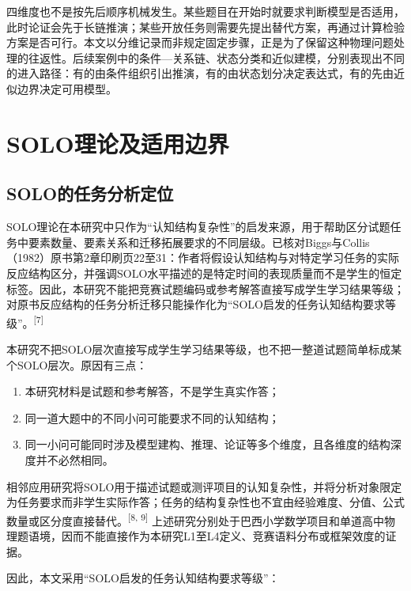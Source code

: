 \documentclass[
  12pt,
  a4paper,twoside,openany]{ctexbook}
\providecommand{\tightlist}{%
  \setlength{\itemsep}{0pt}\setlength{\parskip}{0pt}}
\begin{document}
四维度也不是按先后顺序机械发生。某些题目在开始时就要求判断模型是否适用，此时论证会先于长链推演；某些开放任务则需要先提出替代方案，再通过计算检验方案是否可行。本文以分维记录而非规定固定步骤，正是为了保留这种物理问题处理的往返性。后续案例中的条件---关系链、状态分类和近似建模，分别表现出不同的进入路径：有的由条件组织引出推演，有的由状态划分决定表达式，有的先由近似边界决定可用模型。

\section{SOLO理论及适用边界}\label{soloux7406ux8bbaux53caux9002ux7528ux8fb9ux754c}

\subsection{SOLO的任务分析定位}\label{soloux7684ux4efbux52a1ux5206ux6790ux5b9aux4f4d}

SOLO理论在本研究中只作为``认知结构复杂性''的启发来源，用于帮助区分试题任务中要素数量、要素关系和迁移拓展要求的不同层级。已核对Biggs与Collis（1982）原书第2章印刷页22至31：作者将假设认知结构与对特定学习任务的实际反应结构区分，并强调SOLO水平描述的是特定时间的表现质量而不是学生的恒定标签。因此，本研究不能把竞赛试题编码或参考解答直接写成学生学习结果等级；对原书反应结构的任务分析迁移只能操作化为``SOLO启发的任务认知结构要求等级''。\textsuperscript{[7]}

本研究不把SOLO层次直接写成学生学习结果等级，也不把一整道试题简单标成某个SOLO层次。原因有三点：

\begin{enumerate}
\def\labelenumi{\arabic{enumi}.}
\tightlist
\item
  本研究材料是试题和参考解答，不是学生真实作答；
\item
  同一道大题中的不同小问可能要求不同的认知结构；
\item
  同一小问可能同时涉及模型建构、推理、论证等多个维度，且各维度的结构深度并不必然相同。
\end{enumerate}

相邻应用研究将SOLO用于描述试题或测评项目的认知复杂性，并将分析对象限定为任务要求而非学生实际作答；任务的结构复杂性也不宜由经验难度、分值、公式数量或区分度直接替代。\textsuperscript{[8, 9]}
上述研究分别处于巴西小学数学项目和单道高中物理题语境，因而不能直接作为本研究L1至L4定义、竞赛语料分布或框架效度的证据。

因此，本文采用``SOLO启发的任务认知结构要求等级''：
\end{document}
